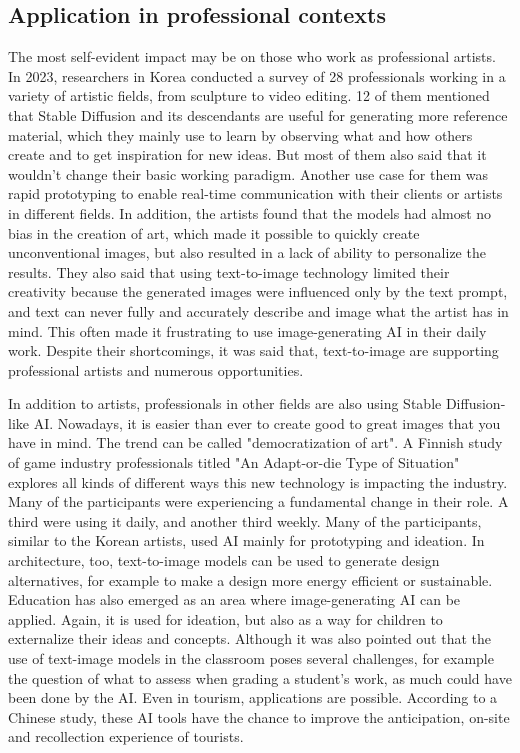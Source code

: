\documentclass[11pt]{article}
\begin{document}
\subsection{Application in professional contexts}
The most self-evident impact may be on those who work as professional artists. In 2023, researchers in Korea conducted a survey of 28 professionals working in a variety of artistic fields, from sculpture to video editing\cite{ko2023largescaletexttoimagegenartionmodelsforvisualartists}. 12 of them mentioned that Stable Diffusion and its descendants are useful for generating more reference material, which they mainly use to learn by observing what and how others create and to get inspiration for new ideas. But most of them also said that it wouldn't change their basic working paradigm. Another use case for them was rapid prototyping to enable real-time communication with their clients or artists in different fields. In addition, the artists found that the models had almost no bias in the creation of art, which made it possible to quickly create unconventional images, but also resulted in a lack of ability to personalize the results. They also said that using text-to-image technology limited their creativity because the generated images were influenced only by the text prompt, and text can never fully and accurately describe and image what the artist has in mind. This often made it frustrating to use image-generating AI in their daily work. Despite their shortcomings, it was said that, text-to-image are supporting professional artists and numerous opportunities.

In addition to artists, professionals in other fields are also using Stable Diffusion-like AI. Nowadays, it is easier than ever to create good to great images that you have in mind. The trend can be called "democratization of art". A Finnish study of game industry professionals\cite{vimpari2023texttoimagegenerationaibygameprofessionals} titled "An Adapt-or-die Type of Situation" explores all kinds of different ways this new technology is impacting the industry. Many of the participants were experiencing a fundamental change in their role. A third were using it daily, and another third weekly. Many of the participants, similar to the Korean artists, used AI mainly for prototyping and ideation. In architecture\cite{sekban2022artandarchtitecture}, too, text-to-image models can be used to generate design alternatives, for example to make a design more energy efficient or sustainable. Education has also emerged as an area where image-generating AI can be applied\cite{vartiainen2023aiincraftseducation}. Again, it is used for ideation, but also as a way for children to externalize their ideas and concepts. Although it was also pointed out that the use of text-image models in the classroom poses several challenges, for example the question of what to assess when grading a student's work, as much could have been done by the AI. Even in tourism, applications are possible. According to a Chinese study\cite{miao2023aiintourism}, these AI tools have the chance to improve the anticipation, on-site and recollection experience of tourists.
\end{document}

